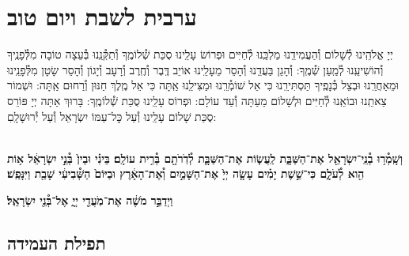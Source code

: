 \documentclass[twoside, openany, parskip=half, 11pt]{book}
\begin{document}
\mournerskaddish

\vspace{\baselineskip}

{\let\clearpage\relax
\chapter[ערבית לשבת ויום טוב]{ ערבית לשבת ויום טוב }}

\barachu

\hamaarivaravim

\ahavasolam

\shema

\veahavta

\vehaya

\vayomer{}

\emesveemuna

יְיָ אֱלֹהֵֽינוּ לְ֯שָׁלוֹם וְ֯הַעֲמִידֵֽנוּ מַלְכֵּֽנוּ לְ֯חַיִּים וּפְרוֹשׂ עָלֵֽינוּ סֻכַּת שְׁ֯לוֹמֶֽךָ וְ֯תַקְּ֯נֵֽנוּ בְּ֯עֵצָה טוֹבָה מִלְּ֯פָנֶֽיךָ וְ֯הוֹשִׁיעֵֽנוּ לְ֯מַֽעַן שְׁ֯מֶֽךָ: וְ֯הָגֵן בַּעֲדֵֽנוּ וְ֯הָסֵר מֵעָלֵֽינוּ אוֹיֵב דֶּֽבֶר וְ֯חֶֽרֶב וְ֯רָעָב וְ֯יָגוֹן וְ֯הָסֵר שָׂטָן מִלְּ֯פָנֵֽינוּ וּמֵאַחֲרֵֽנוּ וּבְצֵל כְּ֯נָפֶֽיךָ תַּסְתִּירֵֽנוּ כִּי אֵל שׁוֹמְ֯רֵֽנוּ וּמַצִּילֵֽנוּ אַֽתָּה כִּי אֵל מֶֽלֶךְ חַנּוּן וְ֯רַחוּם אַֽתָּה:  וּשְׁמוֹר צֵאתֵֽנוּ וּבוֹאֵֽנוּ לְ֯חַיִּים וּלְשָׁלוֹם מֵעַתָּה וְ֯עַד עוֹלָם: וּפְרוֹס עָלֵֽינוּ סֻכַּת שְׁ֯לוֹמֶֽךָ: בָּרוּךְ אַתָּה יְיָ פּוֹרֵס סֻכַּת שָׁלוֹם עָלֵֽינוּ וְ֯עַל כׇּל־עַמּוֹ יִשְׂרָאֵל וְ֯עַל יְ֯רוּשָׁלָֽםִ:

\\
\textbf{וְשָֽׁמְ֯ר֥וּ בְ֯נֵֽי־יִשְׂרָאֵ֖ל אֶת־הַשַּׁבָּ֑ת
לַֽעֲשׂ֧וֹת אֶת־הַשַּׁבָּ֛ת לְ֯דֹֽרֹתָ֖ם בְּ֯רִ֥ית עוֹלָֽם׃ בֵּינִ֗י וּבֵין֙ בְּ֯נֵ֣י יִשְׂרָאֵ֔ל א֥וֹת הִ֖וא לְ֯עֹלָ֑ם כִּי־שֵׁ֣שֶׁת יָמִ֗ים עָשָׂ֤ה יְיָ֙
אֶת־הַשָּׁמַ֣יִם וְ֯אֶת־הָאָ֔רֶץ וּבַיּוֹם֙ הַשְּׁ֯בִיעִ֔י שָׁבַ֖ת וַיִּנָּפַֽשׁ׃
}

\textbf{
וַיְדַבֵּ֣ר מֹשֶׁ֔ה אֶת־מֹֽעֲדֵ֖י יְיָ֑ אֶל־בְּ֯נֵ֖י יִשְׂרָאֵֽל׃
}



\halfkaddish


\section*{ תפילת העמידה }

\newcommand{\shabbosshuva}{בשבת שובה:}
\end{document}
